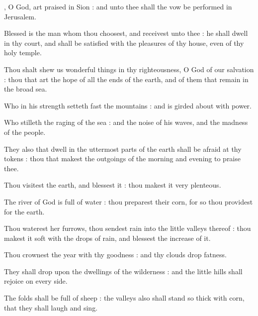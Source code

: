 

, O God, art praised in Sion : and unto thee shall the vow be performed in Jerusalem.\par
{}
Blessed is the man whom thou choosest, and receivest unto thee : he shall dwell in thy court, and shall be satisfied with the pleasures of thy house, even of thy holy temple.\par
{}Thou shalt shew us wonderful things in thy righteousness, O God of our salvation : thou that art the hope of all the ends of the earth, and of them that remain in the broad sea.\par
{}Who in his strength setteth fast the mountains : and is girded about with power.\par
{}Who stilleth the raging of the sea : and the noise of his waves, and the madness of the people.\par
{}They also that dwell in the uttermost parts of the earth shall be afraid at thy tokens : thou that makest the outgoings of the morning and evening to praise thee.\par
{}Thou visitest the earth, and blessest it : thou makest it very plenteous.\par
{}The river of God is full of water : thou preparest their corn, for so thou providest for the earth.\par
{}Thou waterest her furrows, thou sendest rain into the little valleys thereof : thou makest it soft with the drops of rain, and blessest the increase of it.\par
{}Thou crownest the year with thy goodness : and thy clouds drop fatness.\par
{}They shall drop upon the dwellings of the wilderness : and the little hills shall rejoice on every side.\par
{}The folds shall be full of sheep : the valleys also shall stand so thick with corn, that they shall laugh and sing.\par


